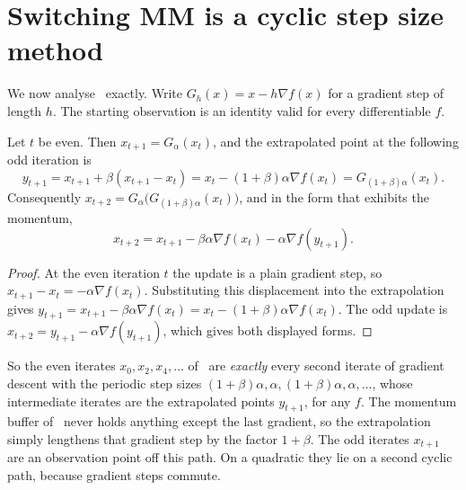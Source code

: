 \section{Switching MM is a cyclic step size method}\label{sec:ch6:cyclic}

We now analyse \smmdet\ exactly. Write $G_h(x)=x-h\nabla f(x)$ for a gradient step
of length $h$. The starting observation is an identity valid for every
differentiable $f$.

\begin{lemma}\label{lem:ch6:ystep}
Let $t$ be even. Then $x_{t+1}=G_\alpha(x_t)$, and the extrapolated point at
the following odd iteration is
\begin{equation}\label{eq:ch6:ystep}
  y_{t+1} = x_{t+1}+\beta(x_{t+1}-x_t) = x_t-(1+\beta)\alpha\nabla f(x_t)
  = G_{(1+\beta)\alpha}(x_t).
\end{equation}
Consequently $x_{t+2}=G_\alpha\bigl(G_{(1+\beta)\alpha}(x_t)\bigr)$, and in the
form that exhibits the momentum,
\begin{equation}\label{eq:ch6:general}
  x_{t+2} = x_{t+1}-\beta\alpha\nabla f(x_t)-\alpha\nabla f(y_{t+1}).
\end{equation}
\end{lemma}

\begin{proof}
At the even iteration $t$ the update is a plain gradient step, so
$x_{t+1}-x_t=-\alpha\nabla f(x_t)$. Substituting this displacement into the
extrapolation gives $y_{t+1}=x_{t+1}-\beta\alpha\nabla f(x_t)
=x_t-(1+\beta)\alpha\nabla f(x_t)$. The odd update is
$x_{t+2}=y_{t+1}-\alpha\nabla f(y_{t+1})$, which gives both displayed forms.
\end{proof}

So the even iterates $x_0,x_2,x_4,\dots$ of \smmdet\ are \emph{exactly} every second iterate of gradient descent with the periodic step sizes $(1+\beta)\alpha,\alpha,(1+\beta)\alpha,\alpha,\dots$, whose intermediate iterates are the extrapolated points $y_{t+1}$, for any $f$.
The momentum
buffer of \smmdet\ never holds anything except the last gradient, so the
extrapolation simply lengthens that gradient step by the factor $1+\beta$. The
odd iterates $x_{t+1}$ are an observation point off this path. On a quadratic
they lie on a second cyclic path, because gradient steps commute.

